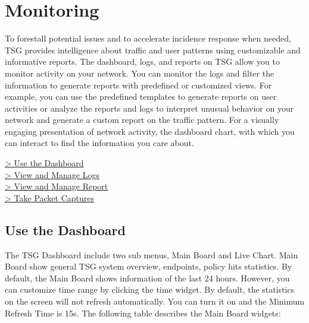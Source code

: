 %
\chapter*{\hypertarget{link:Monitoring}{Monitoring}}
\label{sec:monitor}

To forestall potential issues and to accelerate incidence response when needed, TSG provides intelligence about traffic and user patterns using customizable and informative reports. 
The dashboard, logs, and reports on TSG allow you to monitor activity on your network. You can monitor the logs and filter the information to generate reports with predefined 
or customized views. For example, you can use the predefined templates to generate reports on user activities or analyze the reports and logs to interpret unusual behavior 
on your network and generate a custom report on the traffic pattern. For a visually engaging presentation of network activity, the dashboard chart, with which you can interact 
to find the information you care about. 

{
\color{linkblue}
\hyperlink{link:Use the Dashboard}{> Use the Dashboard} \\
\hyperlink{link:View and Manage Logs}{> View and Manage Logs} \\
\hyperlink{link:View and Manage Report}{> View and Manage Report}\\
\hyperlink{link:Take Packet Captures}{> Take Packet Captures}\\
}
\clearpage

\section*{\hypertarget{link:Use the Dashboard}{Use the Dashboard}}
\label{sec:monitor:dashboard}

The TSG Dashboard include two sub menus, Main Board and Live Chart. Main Board show general TSG system overview, endpoints, policy hits statistics. By default, the Main Board shows information of the last 24 hours. However, you can customize time range by clicking the time widget. By default, the statistics on the screen will not refresh automatically. You can turn it on and the Minimum Refresh Time is 15s. The following table describes the Main Board widgets:


